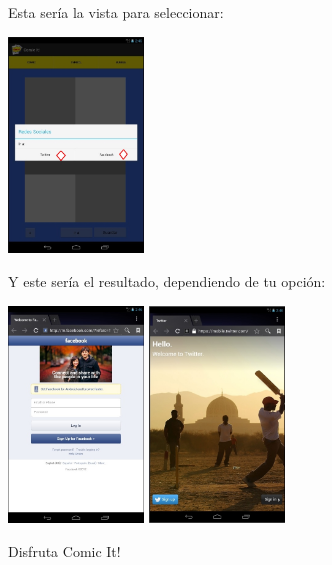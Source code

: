 \documentclass[12pt]{report}
\begin{document}
\vspace{2em}
Esta sería la vista para seleccionar:
\vspace{2em}
	\begin{center}
		\begingroup
			\includegraphics[width=0.27\textwidth]{imagenes_usuario/redes.jpg}
		\endgroup
	\end{center}
\vspace{2em}
Y este sería el resultado, dependiendo de tu opción:
	\begin{center}
		\begingroup
			\includegraphics[width=0.27\textwidth]{imagenes_usuario/fb.jpg}
			\hspace{2em}
			\includegraphics[width=0.27\textwidth]{imagenes_usuario/tw.jpg}
		\endgroup
	\end{center}
\vspace{2em}
\hspace{30em}Disfruta Comic It!
\end{document}
